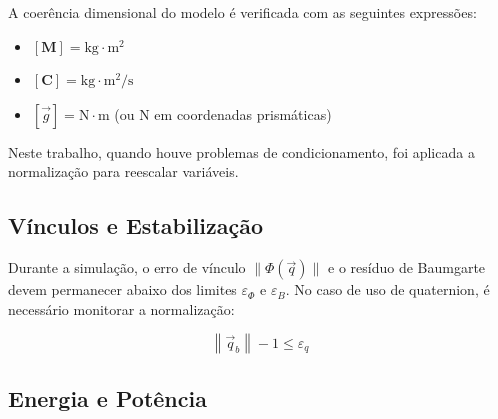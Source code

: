 A coerência dimensional do modelo é verificada com as seguintes expressões:

\begin{itemize}
\item $ [\mathbf{M}] = \mathrm{kg} \cdot \mathrm{m}^2 $
\item $ [\mathbf{C}] = \mathrm{kg} \cdot \mathrm{m}^2 / \mathrm{s} $
\item $ [\vec{g}] = \mathrm{N} \cdot \mathrm{m} $ (ou $ \mathrm{N} $ em coordenadas prismáticas)
\end{itemize}

Neste trabalho, quando houve problemas de condicionamento, foi aplicada a normalização para reescalar variáveis.

\subsection{Vínculos e Estabilização}

Durante a simulação, o erro de vínculo $ \| \Phi(\vec{q}) \| $ e o resíduo de Baumgarte devem permanecer abaixo dos limites $ \varepsilon_\Phi $ e $ \varepsilon_B $. No caso de uso de quaternion, é necessário monitorar a normalização:

\begin{equation}
\left\| \vec{q}_b \right\| - 1 \leq \varepsilon_q
\label{eq:erro_quaternion}
\end{equation}





\subsection{Energia e Potência}


